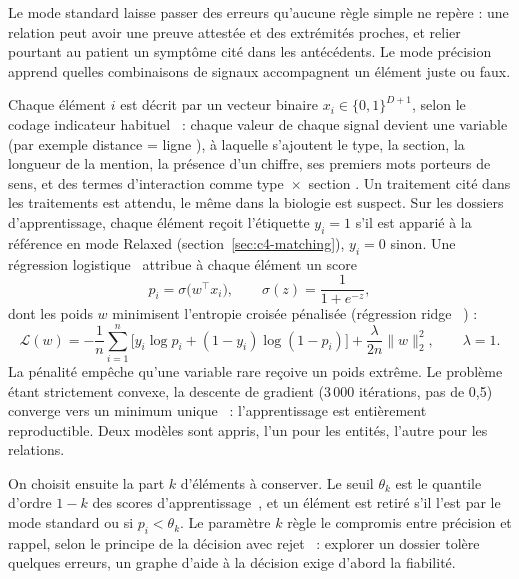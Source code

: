 Le mode standard laisse passer des erreurs qu'aucune règle simple ne repère : une relation peut avoir une preuve attestée et des extrémités proches, et relier pourtant au patient un symptôme cité dans les antécédents. Le mode précision apprend quelles combinaisons de signaux accompagnent un élément juste ou faux.

Chaque élément $i$ est décrit par un vecteur binaire $x_i \in \{0,1\}^{D+1}$, selon le codage indicateur habituel~\cite{hastie2009elements} : chaque valeur de chaque signal devient une variable (par exemple \og distance = ligne \fg{}), à laquelle s'ajoutent le type, la section, la longueur de la mention, la présence d'un chiffre, ses premiers mots porteurs de sens, et des termes d'interaction comme \og type~$\times$~section \fg{}. Un traitement cité dans les traitements est attendu, le même dans la biologie est suspect. Sur les dossiers d'apprentissage, chaque élément reçoit l'étiquette $y_i = 1$ s'il est apparié à la référence en mode Relaxed (section~\ref{sec:c4-matching}), $y_i = 0$ sinon. Une régression logistique~\cite{cox1958regression} attribue à chaque élément un score
\begin{equation}
p_i = \sigma\big(w^\top x_i\big), \qquad \sigma(z) = \frac{1}{1 + e^{-z}},
\end{equation}
dont les poids $w$ minimisent l'entropie croisée pénalisée (régression \og ridge \fg{}~\cite{lecessie1992ridge}) :
\begin{equation}
\mathcal{L}(w) = -\frac{1}{n} \sum_{i=1}^{n} \Big[ y_i \log p_i + (1 - y_i) \log (1 - p_i) \Big] + \frac{\lambda}{2n} \lVert w \rVert_2^2, \qquad \lambda = 1.
\end{equation}
La pénalité empêche qu'une variable rare reçoive un poids extrême. Le problème étant strictement convexe, la descente de gradient (3\,000 itérations, pas de 0,5) converge vers un minimum unique~\cite{boyd2004convex} : l'apprentissage est entièrement reproductible. Deux modèles sont appris, l'un pour les entités, l'autre pour les relations.

On choisit ensuite la part $k$ d'éléments à conserver. Le seuil $\theta_k$ est le quantile d'ordre $1-k$ des scores d'apprentissage~\cite{hyndman1996quantiles}, et un élément est retiré s'il l'est par le mode standard ou si $p_i < \theta_k$. Le paramètre $k$ règle le compromis entre précision et rappel, selon le principe de la décision avec rejet~\cite{chow1970reject,geifman2017selective} : explorer un dossier tolère quelques erreurs, un graphe d'aide à la décision exige d'abord la fiabilité.

